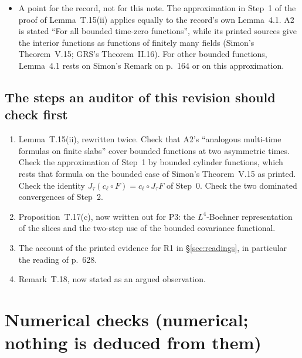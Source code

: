 \documentclass[11pt,a4paper]{article}
\newcommand{\Psit}{\widetilde\Psi}
\theoremstyle{plain}
\theoremstyle{definition}
\begin{document}
\begin{itemize}
\begin{itemize}
l.~3378.
\item Proposition~C.7 (ll.~4087--4101), the inventory of every application of Source Fact~2.2,
which must add P3--P4.
\item The Discussion (l.~3291), which calls $\Psi_{m_1}$ ``super-polynomial but sub-exponential''.
$\Psit_{m_1}$ contains the same $T_{m_1}$ terms; that characterization was not checked for
either function.
\item The new statements T.3--T.16, and the wording of Remark~N.39 above.
\end{itemize}
\item A point for the record, not for this note.  The approximation in Step~1 of the proof of
Lemma~T.15(ii) applies equally to the record's own Lemma~4.1.  A2 is stated ``For all bounded
time-zero functions'', while its printed sources give the interior functions as functions of
finitely many fields (Simon's Theorem~V.15; GRS's Theorem~II.16).  For other bounded functions,
Lemma~4.1 rests on Simon's Remark on p.~164 or on this approximation.
\end{itemize}

\subsection{The steps an auditor of this revision should check first}

\begin{enumerate}
\item Lemma~T.15(ii), rewritten twice.  Check that A2's ``analogous multi-time formulas on finite
slabs'' cover bounded functions at two asymmetric times.  Check the approximation of Step~1 by
bounded cylinder functions, which rests that formula on the bounded case of Simon's
Theorem~V.15 as printed.  Check the identity $J_\tau(c_\ell\circ F)=c_\ell\circ J_\tau F$ of
Step~0.  Check the two dominated convergences of Step~2.
\item Proposition~T.17(c), now written out for P3: the $L^4$-Bochner representation of the slices
and the two-step use of the bounded covariance functional.
\item The account of the printed evidence for R1 in \S\ref{sec:readings}, in particular the
reading of p.~628.
\item Remark~T.18, now stated as an argued observation.
\end{enumerate}

\appendix
\section{Numerical checks (numerical; nothing is deduced from them)}\label{app:numerics}
\end{document}
